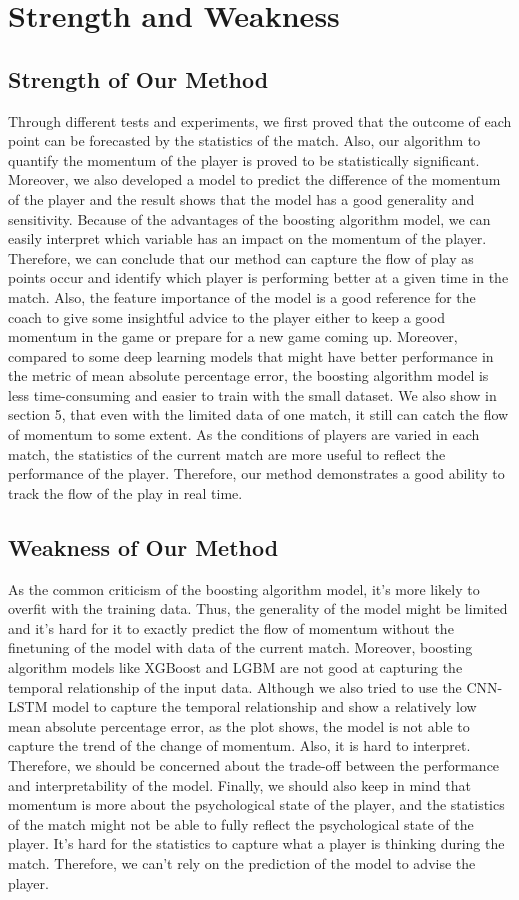 \documentclass[12pt]{article}
\begin{document}
\section{Strength and Weakness}
\subsection{Strength of Our Method}
\quad Through different tests and experiments, we first proved that the outcome of each point can be forecasted by the statistics of the match. Also, our algorithm to quantify the momentum of the player
is proved to be statistically significant. Moreover, we also developed a model to predict the difference of the momentum of the player and the result shows that the model has a good generality and
sensitivity. Because of the advantages of the boosting algorithm model, we can easily interpret which variable has an impact on the momentum of the player.
Therefore, we can conclude that our method can capture the flow of play as points occur and identify which player is performing better at a given time in the match. Also, the feature 
importance of the model is a good reference for the coach to give some insightful advice to the player either to keep a good momentum in the game or prepare for a new game coming up. Moreover, compared to some 
deep learning models that might have better performance in the metric of mean absolute percentage error, the boosting algorithm model is less time-consuming and easier to train with the small dataset. We also 
show in section 5, that even with the limited data of one match, it still can catch the flow of momentum to some extent. As the conditions of players are varied in each match, the statistics of the current match are more 
useful to reflect the performance of the player. Therefore, our method demonstrates a good ability to track the flow of the play in real time.

\subsection{Weakness of Our Method}
\quad As the common criticism of the boosting algorithm model, it's more likely to overfit with the training data. Thus, the generality of the model might be limited and it's hard for it to exactly predict the 
flow of momentum without the finetuning of the model with data of the current match. Moreover, boosting algorithm models like XGBoost and LGBM are not good at capturing the temporal relationship of the input data. 
Although we also tried to use the CNN-LSTM model to capture the temporal relationship and show a relatively low mean absolute percentage error, as the plot shows, the model is not able to capture the trend of the
change of momentum. Also, it is hard to interpret. Therefore, we should be concerned about the trade-off between the performance and interpretability of the model. Finally, we should also keep in mind that  
momentum is more about the psychological state of the player, and the statistics of the match might not be able to fully reflect the psychological state of the player. It's hard for the statistics to capture what a 
player is thinking during the match. Therefore, we can't rely on the prediction of the model to advise the player.
\end{document}
